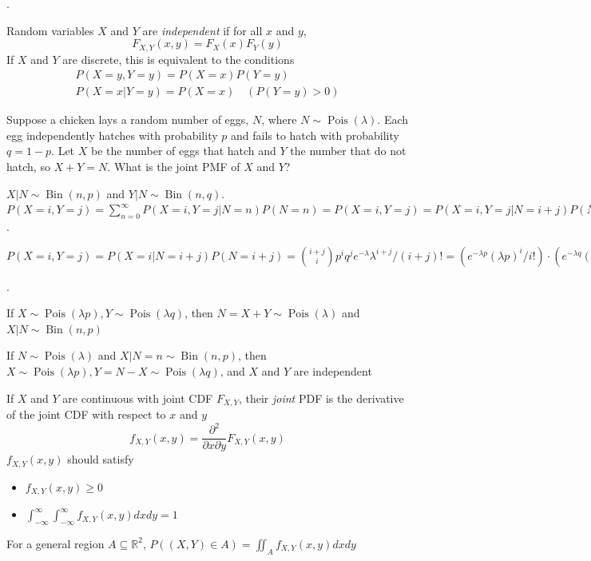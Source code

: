 \documentclass[8pt]{beamer}
\newcommand{\mbb}[1]{\mathbb{#1}}
\newcommand{\ti}[1]{\textit{#1}}
\newcommand{\mypois}[1]{\operatorname{Pois}(#1)}
\newcommand{\mybin}[2]{\operatorname{Bin}\!\left(#1,#2\right)}
\begin{document}
\begin{frame}{.}
    \begin{definition}[Independence of r.v.s]
        Random variables $X$ and $Y$ are \ti{independent} if for all $x$ and $y$,
        \[
            F_{X,Y} (x,y) = F_X(x) F_Y(y)
        \]
        If $X$ and $Y$ are discrete, this is equivalent to the conditions
        \[
        \begin{gathered}
            P(X=y,Y=y) = P(X=x)P(Y=y)\\
            P(X=x|Y=y) = P(X=x) \quad (P(Y=y) > 0)
        \end{gathered}
        \]
    \end{definition}
    \begin{example}
        Suppose a chicken lays a random number of eggs, $N$, where $N\sim \mypois{\lambda}$. Each egg independently hatches with probability $p$ and fails to hatch with probability $q= 1 - p$. Let $X$ be the number of eggs that hatch and $Y$ the number that do not hatch, so $X+Y = N$. What is the joint PMF of $X$ and $Y$?
    \end{example}

    $X|N \sim \mybin{n}{p}$ and $Y|N \sim \mybin{n}{q}$. $P(X=i,Y=j) = \sum_{n=0}^\infty P(X=i,Y=j|N=n)P(N=n) = P(X=i,Y=j) = P(X=i,Y=j|N=i+j)P(N=i+j) = P(X=i|N=i+j)P(N=i+j)$.

    $P(X=i,Y=j) = P(X=i|N=i+j)P(N=i+j) = \binom{i+j}{i} p^i q^j e^{-\lambda} \lambda^{i+j} / (i+j)! = (e^{-\lambda p} (\lambda p)^i / i!)\cdot (e^{-\lambda q} (\lambda q)^{j} / j!) \implies X \sim \mypois{\lambda p}, Y \sim \mypois{\lambda q}$
\end{frame}

\begin{frame}{.}
    \begin{theorem}
        If $X\sim \mypois{\lambda p}, Y\sim \mypois{\lambda q}$, then $N=X+Y \sim \mypois{\lambda}$ and $X|N \sim \mybin{n}{p}$
    \end{theorem}
    \begin{theorem}
        If $N \sim \mypois{\lambda}$ and $X|N = n \sim \mybin{n}{p}$, then $X\sim \mypois{\lambda p }, Y = N-X \sim \mypois{\lambda q}$, and $X$ and $Y$ are independent
    \end{theorem}
    \begin{definition}
        If $X$ and $Y$ are continuous with joint CDF $F_{X,Y}$, their \ti{joint} PDF is the derivative of the joint CDF with respect to $x$ and $y$
        \[
            f_{X,Y}(x,y) = \frac{\partial^2}{\partial x \partial y} F_{X,Y}(x,y)
        \]
        $f_{X,Y} (x,y)$ should satisfy
        \begin{itemize}
            \item $f_{X,Y} (x,y) \geq 0$
            \item $\int_{-\infty}^\infty \int_{-\infty}^\infty f_{X,Y}(x,y) dx dy =1$
        \end{itemize}
    \end{definition}
    For a general region $A \subseteq \mbb{R}^2$, $P((X,Y)\in A) = \iint_{A} f_{X,Y} (x,y) dx dy$
\end{frame}
\end{document}
